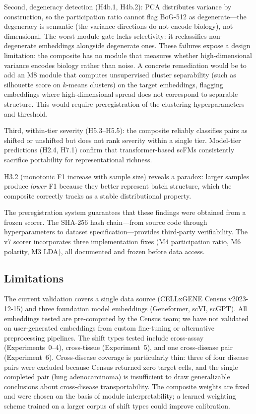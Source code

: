 \documentclass[11pt,letterpaper]{article}
\begin{document}
Second, degeneracy detection (H4b.1, H4b.2): PCA distributes variance by construction, so the participation ratio cannot flag BoG-512 as degenerate---the degeneracy is semantic (the variance directions do not encode biology), not dimensional. The worst-module gate lacks selectivity: it reclassifies non-degenerate embeddings alongside degenerate ones. These failures expose a design limitation: the composite has no module that measures whether high-dimensional variance encodes biology rather than noise. A concrete remediation would be to add an M8 module that computes unsupervised cluster separability (such as silhouette score on $k$-means clusters) on the target embeddings, flagging embeddings where high-dimensional spread does not correspond to separable structure. This would require preregistration of the clustering hyperparameters and threshold.

Third, within-tier severity (H5.3--H5.5): the composite reliably classifies pairs as shifted or unshifted but does not rank severity within a single tier. Model-tier predictions (H2.4, H7.1) confirm that transformer-based scFMs consistently sacrifice portability for representational richness.

H3.2 (monotonic F1 increase with sample size) reveals a paradox: larger samples produce \emph{lower} F1 because they better represent batch structure, which the composite correctly tracks as a stable distributional property.

The preregistration system guarantees that these findings were obtained from a frozen scorer. The SHA-256 hash chain---from source code through hyperparameters to dataset specification---provides third-party verifiability. The v7 scorer incorporates three implementation fixes (M4 participation ratio, M6 polarity, M3 LDA), all documented and frozen before data access.

\subsection{Limitations}

The current validation covers a single data source (CELLxGENE Census v2023-12-15) and three foundation model embeddings (Geneformer, scVI, scGPT). All embeddings tested are pre-computed by the Census team; we have not validated on user-generated embeddings from custom fine-tuning or alternative preprocessing pipelines. The shift types tested include cross-assay (Experiments~0--4), cross-tissue (Experiment~5), and one cross-disease pair (Experiment~6). Cross-disease coverage is particularly thin: three of four disease pairs were excluded because Census returned zero target cells, and the single completed pair (lung adenocarcinoma) is insufficient to draw generalizable conclusions about cross-disease transportability. The composite weights are fixed and were chosen on the basis of module interpretability; a learned weighting scheme trained on a larger corpus of shift types could improve calibration.
\end{document}

